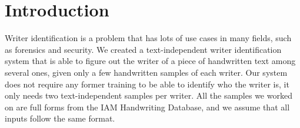 \section{Introduction}
Writer identification is a problem that has lots of use cases in many fields, such as forensics and security. We created a text-independent writer identification system that is able to figure out the writer of a piece of handwritten text among several ones, given only a few handwritten samples of each writer. Our system does not require any former training to be able to identify who the writer is, it only needs two text-independent samples per writer. All the samples we worked on are full forms from the IAM Handwriting Database, and we assume that all inputs follow the same format.